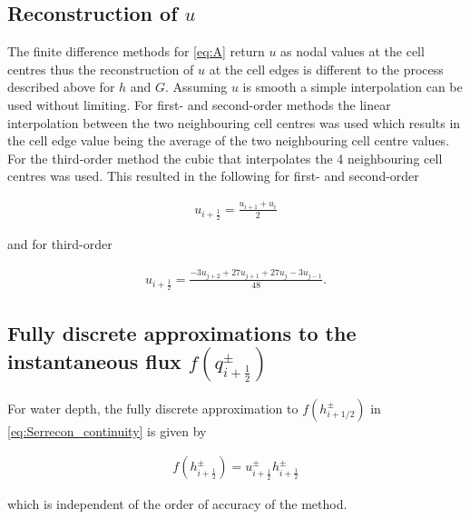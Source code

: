\documentclass[SingleSpace,12pt,Proceedings]{Serre_ASCE}
\begin{document}
\subsection{Reconstruction of $u$} %
The finite difference methods for \eqref{eq:A} return $u$ as nodal values at the cell centres thus the reconstruction of $u$ at the cell edges is different to the process described above for $h$ and $G$. Assuming $u$ is smooth a simple interpolation can be used without limiting. For first- and second-order methods the linear interpolation between the two neighbouring cell centres was used which results in the cell edge value being the average of the two neighbouring cell centre values. For the third-order method the cubic that interpolates the 4 neighbouring cell centres was used. This resulted in the following for first- and second-order
\begin{linenomath*}
\begin{gather*} %
u_{i+ \frac{1}{2}} = \frac{u_{i+1} + u_{i}}{2}
\end{gather*}
\end{linenomath*}
and for third-order
\begin{linenomath*}
\begin{gather*} %
u_{i+ \frac{1}{2}} =\frac{-3u_{j+2} + 27u_{j+1} + 27u_j - 3u_{j-1}}{48}.
\end{gather*}
\end{linenomath*}



\subsection{Fully discrete approximations to the instantaneous flux $f(q^{\pm}_{i + \frac{1}{2}})$} %
For water depth, the fully discrete approximation to $f(h^\pm_{i + 1/2})$ in \eqref{eq:Serrecon_continuity} is given by
\begin{linenomath*}
\begin{gather*} %
f\left(h^\pm_{i + \frac{1}{2}}\right) = u^\pm_{i + \frac{1}{2}} h^\pm_{i + \frac{1}{2}}
\end{gather*}
\end{linenomath*}
which is independent of the order of accuracy of the method. 
\end{document}
